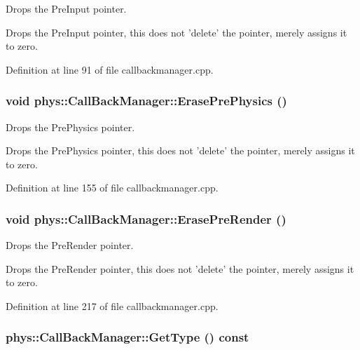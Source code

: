 Drops the PreInput pointer. 

Drops the PreInput pointer, this does not 'delete' the pointer, merely assigns it to zero. 

Definition at line 91 of file callbackmanager.cpp.

\hypertarget{classphys_1_1CallBackManager_afaeba4d6ae245d1560b76799417cce40}{
\subsubsection[{ErasePrePhysics}]{\setlength{\rightskip}{0pt plus 5cm}void phys::CallBackManager::ErasePrePhysics ()}}
\label{d1/d47/classphys_1_1CallBackManager_afaeba4d6ae245d1560b76799417cce40}


Drops the PrePhysics pointer. 

Drops the PrePhysics pointer, this does not 'delete' the pointer, merely assigns it to zero. 

Definition at line 155 of file callbackmanager.cpp.

\hypertarget{classphys_1_1CallBackManager_adadf16f3f38398c9593646416ef18499}{
\subsubsection[{ErasePreRender}]{\setlength{\rightskip}{0pt plus 5cm}void phys::CallBackManager::ErasePreRender ()}}
\label{d1/d47/classphys_1_1CallBackManager_adadf16f3f38398c9593646416ef18499}


Drops the PreRender pointer. 

Drops the PreRender pointer, this does not 'delete' the pointer, merely assigns it to zero. 

Definition at line 217 of file callbackmanager.cpp.

\hypertarget{classphys_1_1CallBackManager_aa0568dd5c2d1bb6dc669dfa2ca3486ad}{
\subsubsection[{GetType}]{ phys::CallBackManager::GetType () const}}
\label{d1/d47/classphys_1_1CallBackManager_aa0568dd5c2d1bb6dc669dfa2ca3486ad}


